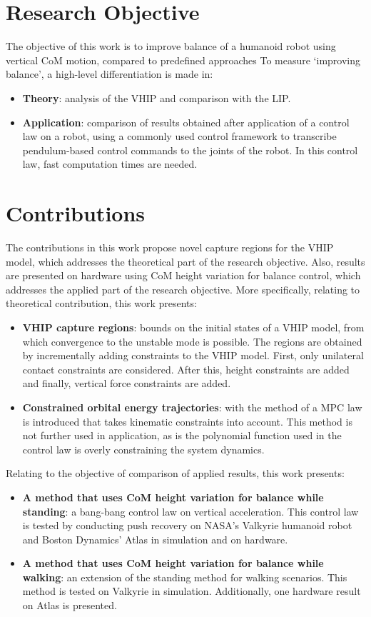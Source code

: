 \section{Research Objective}
The objective of this work is to improve balance of a humanoid robot using vertical \ac{CoM} motion, compared to predefined approaches To measure `improving balance', a high-level differentiation is made in:
\begin{itemize}
	\item \textbf{Theory}: analysis of the \ac{VHIP} and comparison with the \ac{LIP}.
	\item \textbf{Application}: comparison of results obtained after application of a control law on a robot, using a commonly used control framework to transcribe pendulum-based control commands to the joints of the robot. In this control law, fast computation times are needed.
\end{itemize}

\section{Contributions}
The contributions in this work propose novel capture regions for the \ac{VHIP} model, which addresses the theoretical part of the research objective. Also, results are presented on hardware using \ac{CoM} height variation for balance control, which addresses the applied part of the research objective. More specifically, relating to theoretical contribution, this work presents:
\begin{itemize}
	\item \textbf{\ac{VHIP} capture regions}: bounds on the initial states of a \ac{VHIP} model, from which convergence to the unstable mode is possible. The regions are obtained by incrementally adding constraints to the \ac{VHIP} model. First, only unilateral contact constraints are considered. After this, height constraints are added and finally, vertical force constraints are added.
      \item \textbf{Constrained orbital energy trajectories}: with the method of \cite{koolen2016balance} a \ac{MPC} law is introduced that takes kinematic constraints into account. This method is not further used in application, as is the polynomial function used in the control law is overly constraining the system dynamics.
\end{itemize}

Relating to the objective of comparison of applied results, this work presents:
\begin{itemize}
	\item \textbf{A method that uses \ac{CoM} height variation for balance while standing}: a bang-bang control law on vertical acceleration. This control law is tested by conducting push recovery on NASA's Valkyrie humanoid robot and Boston Dynamics' Atlas in simulation and on hardware.
	\item \textbf{A method that uses \ac{CoM} height variation for balance while walking}: an extension of the standing method for walking scenarios. This method is tested on Valkyrie in simulation. Additionally, one hardware result on Atlas is presented.
\end{itemize}
